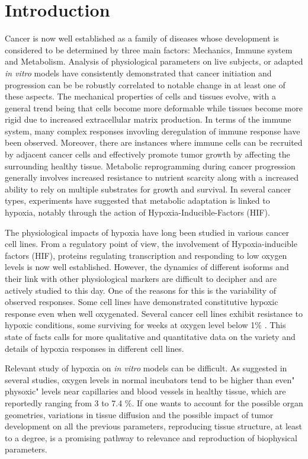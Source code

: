 \documentclass[11pt,a4paper]{article}
\begin{document}
\section{Introduction}
Cancer is now well established as a family of diseases whose development is considered to be determined by three main factors: Mechanics, Immune system and Metabolism. Analysis of physiological parameters on live subjects, or adapted \textit{in vitro} models have consistently demonstrated that cancer initiation and progression can be be robustly correlated to notable change in at least one of these aspects. The mechanical properties of cells and tissues evolve, with a general trend being that cells become more deformable while tissues become more rigid due to increased extracellular matrix production.\cite{Chin2016} In terms of the immune system, many complex responses invovling deregulation of immune response have been observed.\cite{Pardoll2015} Moreover, there are instances where immune cells can be recruited by adjacent cancer cells and effectively promote tumor growth by affecting the surrounding healthy tissue.\cite{Gonzalez2018} Metabolic reprogramming during cancer progression generally involves increased resistance to nutrient scarcity along with a increased ability to rely on multiple substrates for growth and survival. In several cancer types, experiments have suggested that metabolic adaptation is linked to hypoxia, notably through the action of Hypoxia-Inducible-Factors (HIF).\cite{Rakotomalala2021}

The physiological impacts of hypoxia have long been studied in various cancer cell lines. From a regulatory point of view, the involvement of Hypoxia-inducible factors (HIF), proteins regulating transcription and responding to low oxygen levels is now well established.\cite{Strickland2017}\cite{Chen2021} However, the dynamics of different isoforms and their link with other physiological markers are difficult to decipher and are actively studied to this day. One of the reasons for this is the variability of observed responses. Some cell lines have demonstrated constitutive hypoxic response even when well oxygenated.\cite{Aebersold2001} Several cancer cell lines exhibit resistance to hypoxic conditions, some surviving for weeks at oxygen level below 1\% \cite{McKeown2014}. This state of facts calls for more qualitative and quantitative data on the variety and details of hypoxia responses in different cell lines.

Relevant study of hypoxia on \textit{in vitro} models can be difficult. As suggested in several studies, oxygen levels in normal incubators tend to be higher than even" physoxic" levels near capillaries and blood vessels in healthy tissue, which are reportedly ranging from  3 to 7.4 \%.\cite{McKeown2014} If one wants to account for the possible organ geometries, variations in tissue diffusion and the possible impact of tumor development on all the previous parameters, reproducing tissue structure, at least to a degree, is a promising pathway to relevance and reproduction of biophysical parameters.
\end{document}

